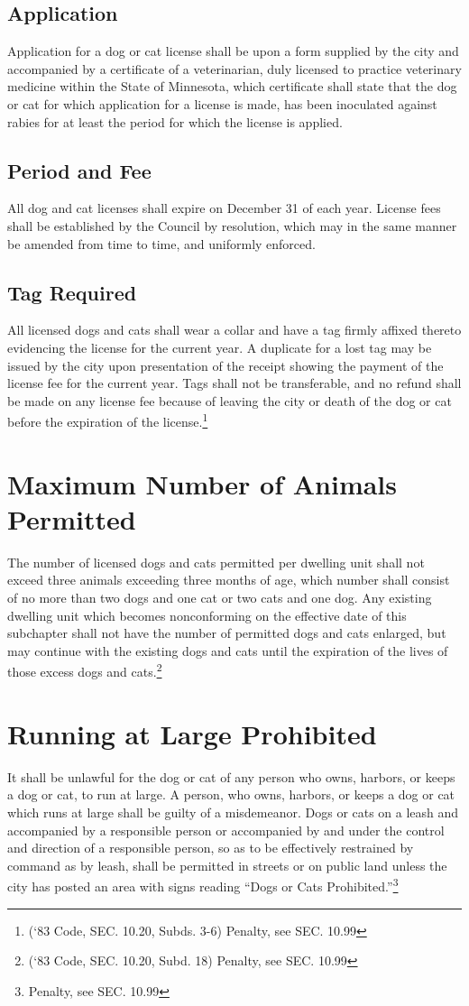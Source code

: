 \subsection{Application}
Application for a dog or cat license shall be upon a form supplied by the city and accompanied by a certificate of a veterinarian, duly licensed to practice veterinary medicine within the State of Minnesota, which certificate shall state that the dog or cat for which application for a license is made, has been inoculated against rabies for at least the period for which the license is applied.
\subsection{Period and Fee}
All dog and cat licenses shall expire on December 31 of each year.  License fees shall be established by the Council by resolution, which may in the same manner be amended from time to time, and uniformly enforced.
\subsection{Tag Required}
All licensed dogs and cats shall wear a collar and have a tag firmly affixed thereto evidencing the license for the current year.  A duplicate for a lost tag may be issued by the city upon presentation of the receipt showing the payment of the license fee for the current year.  Tags shall not be transferable, and no refund shall be made on any license fee because of leaving the city or death of the dog or cat before the expiration of the license.\footnote{(‘83 Code, SEC. 10.20, Subds. 3-6)  Penalty, see SEC. 10.99}

\section{Maximum Number of Animals Permitted}
The number of licensed dogs and cats permitted per dwelling unit shall not exceed three animals exceeding three months of age, which number shall consist of no more than two dogs and one cat or two cats and one dog. Any existing dwelling unit which becomes nonconforming on the effective date of this subchapter shall not have the number of permitted dogs and cats enlarged, but may continue with the existing dogs and cats until the expiration of the lives of those excess dogs and cats.\footnote{(‘83 Code, SEC. 10.20, Subd. 18)  Penalty, see SEC. 10.99}

\section{Running at Large Prohibited}
It shall be unlawful for the dog or cat of any person who owns, harbors, or keeps a dog or cat, to run at large.  A person, who owns, harbors, or keeps a dog or cat which runs at large shall be guilty of a misdemeanor.  Dogs or cats on a leash and accompanied by a responsible person or accompanied by and under the control and direction of a responsible person, so as to be effectively restrained by command as by leash, shall be permitted in streets or on public land unless the city has posted an area with signs reading “Dogs or Cats Prohibited.”\footnote{Penalty, see SEC. 10.99}


